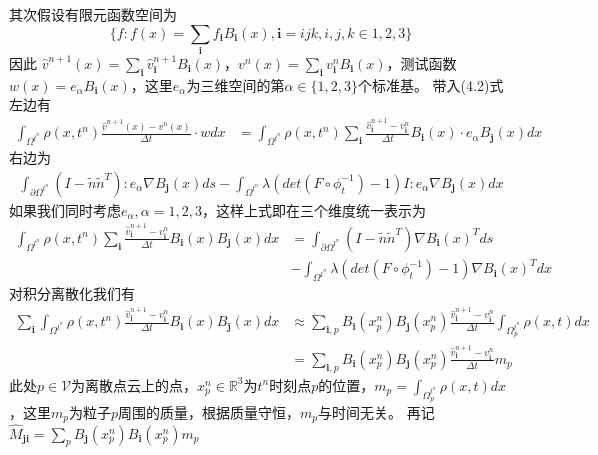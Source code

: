 其次假设有限元函数空间为$$\{f: f(x) = \sum_\mathbf{i} f_\mathbf{i} B_\mathbf{i}(x), \mathbf{i} = ijk, i,j,k\in{1,2,3}\}$$因此
$\hat{v}^{n+1}(x) = \sum_{\mathbf{i}}\hat{v}^{n+1}_{\mathbf{i}}B_{\mathbf{i}}(x)$，$v^n(x) = \sum_{\mathbf{i}}v^n_{\textbf{i}}B_{\textbf{i}}(x)$，测试函数$w(x) = e_{\alpha}B_{\mathbf{i}}(x)$，这里$e_{\alpha}$为三维空间的第$\alpha\in\{1,2,3\}$个标准基。
带入(4.2)式左边有
\begin{align}
    \int_{\Omega^{t^n}}\rho(x,t^n)\frac{\hat{v}^{n+1}(x) - v^n(x)}{\Delta t}\cdot w dx &=  \int_{\Omega^{t^n}} \rho(x,t^n)\sum_{\mathbf{i}}\frac{\hat{v}^{n+1}_\mathbf{i} - v^n_{\mathbf{i}}}{\Delta t}B_\mathbf{i}(x)\cdot e_{\alpha}B_{\mathbf{j}}(x)dx\nonumber
\end{align}
右边为
\begin{align}
    \int_{\partial \Omega^{t^n}} (I - \tilde{n}\tilde{n}^T):e_{\alpha}\nabla B_{\mathbf{j}}(x) ds - \int_{\Omega^{t^n}}\lambda (det(F\circ \phi_t^{-1}) - 1)I:e_{\alpha}\nabla B_\mathbf{j}(x) dx
\end{align}
如果我们同时考虑$e_{\alpha},\alpha = 1,2,3$，这样上式即在三个维度统一表示为
\begin{align}
    \int_{\Omega^{t^n}}\rho(x,t^n)\sum_\mathbf{i} \frac{\hat{v}^{n+1}_\mathbf{i} - v^n_{\mathbf{i}}}{\Delta t}B_\mathbf{i}(x)B_\mathbf{j}(x)dx &= \int_{\partial \Omega^{t^n}} (I - \tilde{n}\tilde{n}^T)\nabla B_{\mathbf{i}}(x)^T ds \nonumber\\
                                                                            & - \int_{\Omega^{t^n}} \lambda (det(F\circ \phi_t^{-1}) - 1)\nabla B_\mathbf{i}(x)^T dx \nonumber     
\end{align}
对积分离散化我们有
\begin{align}
    \sum_\mathbf{i}\int_{\Omega^{t^n}}\rho(x,t^n) \frac{\hat{v}^{n+1}_\mathbf{i} - v^n_{\mathbf{i}}}{\Delta t}B_\mathbf{i}(x)B_\mathbf{j}(x)dx &\approx \sum_{\mathbf{i},p}B_\mathbf{i}(x_p^n)B_\mathbf{j}(x_p^n)\frac{\hat{v}^{n+1}_\mathbf{i} - v^n_{\mathbf{i}}}{\Delta t}\int_{\Omega^{t^n}_p}\rho(x,t)dx\nonumber\\
    &= \sum_{\mathbf{i},p}B_\mathbf{i}(x_p^n)B_\mathbf{j}(x_p^n)\frac{\hat{v}^{n+1}_\mathbf{i} - v^n_{\mathbf{i}}}{\Delta t}m_p
\end{align}
此处$p\in \mathcal{V}$为离散点云上的点，$x_p^n\in \mathbb{R}^3$为$t^n$时刻点$p$的位置，$m_p = \int_{\Omega_p^{t^n}} \rho(x,t)dx$，这里$m_p$为粒子$p$周围的质量，根据质量守恒，$m_p$与时间无关。
再记$\hat{M}_{\mathbf{j}\mathbf{i}} = \sum_p B_{\mathbf{j}}(x_p^n)B_{\mathbf{i}}(x_p^n)m_p$
